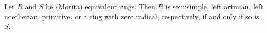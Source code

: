 Let $R$ and $S$ be (Morita) equivalent rings. Then $R$ is semisimple, left artinian, left noetherian, primitive, or a ring with zero radical, respectively, if and only if so is $S$.
